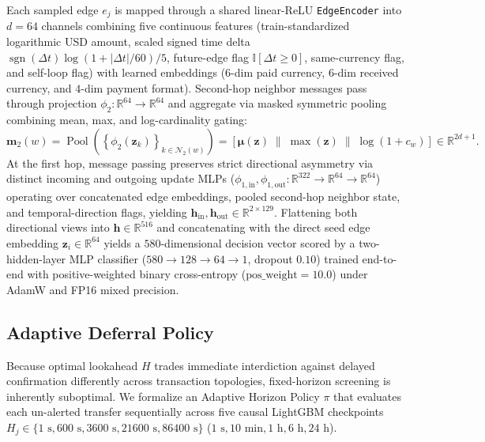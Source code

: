 \documentclass[pdflatex,sn-mathphys,Numbered]{sn-jnl}
\theoremstyle{thmstyleone}
\begin{document}
Each sampled edge $e_j$ is mapped through a shared linear-ReLU \texttt{EdgeEncoder} into $d = 64$ channels combining five continuous features (train-standardized logarithmic USD amount, scaled signed time delta $\operatorname{sgn}(\Delta t)\log(1 + |\Delta t|/60)/5$, future-edge flag $\mathbb{I}[\Delta t \ge 0]$, same-currency flag, and self-loop flag) with learned embeddings ($6$-dim paid currency, $6$-dim received currency, and $4$-dim payment format). Second-hop neighbor messages pass through projection $\phi_2: \mathbb{R}^{64} \to \mathbb{R}^{64}$ and aggregate via masked symmetric pooling combining mean, max, and log-cardinality gating:
\begin{equation}\label{eq:masked_pool}
\mathbf{m}_2(w) = \operatorname{Pool}\!\left(\left\{ \phi_2(\mathbf{z}_k) \right\}_{k \in \mathcal{N}_2(w)}\right) = \left[ \bm{\mu}(\mathbf{z}) \;\middle\|\; \max(\mathbf{z}) \;\middle\|\; \log(1 + c_w) \right] \in \mathbb{R}^{2d + 1}.
\end{equation}
At the first hop, message passing preserves strict directional asymmetry via distinct incoming and outgoing update MLPs ($\phi_{1,\text{in}}, \phi_{1,\text{out}}: \mathbb{R}^{322} \to \mathbb{R}^{64} \to \mathbb{R}^{64}$) operating over concatenated edge embeddings, pooled second-hop neighbor state, and temporal-direction flags, yielding $\mathbf{h}_{\text{in}}, \mathbf{h}_{\text{out}} \in \mathbb{R}^{2 \times 129}$. Flattening both directional views into $\mathbf{h} \in \mathbb{R}^{516}$ and concatenating with the direct seed edge embedding $\mathbf{z}_i \in \mathbb{R}^{64}$ yields a $580$-dimensional decision vector scored by a two-hidden-layer MLP classifier ($580 \to 128 \to 64 \to 1$, dropout $0.10$) trained end-to-end with positive-weighted binary cross-entropy ($\text{pos\_weight} = 10.0$) under AdamW and FP16 mixed precision.

\subsection{Adaptive Deferral Policy}\label{sec:adaptive_policy}

Because optimal lookahead $H$ trades immediate interdiction against delayed confirmation differently across transaction topologies, fixed-horizon screening is inherently suboptimal. We formalize an Adaptive Horizon Policy $\pi$ that evaluates each un-alerted transfer sequentially across five causal LightGBM checkpoints $H_j \in \{1\text{ s}, 600\text{ s}, 3600\text{ s}, 21600\text{ s}, 86400\text{ s}\}$ ($1\text{ s}, 10\text{ min}, 1\text{ h}, 6\text{ h}, 24\text{ h}$).
\end{document}
